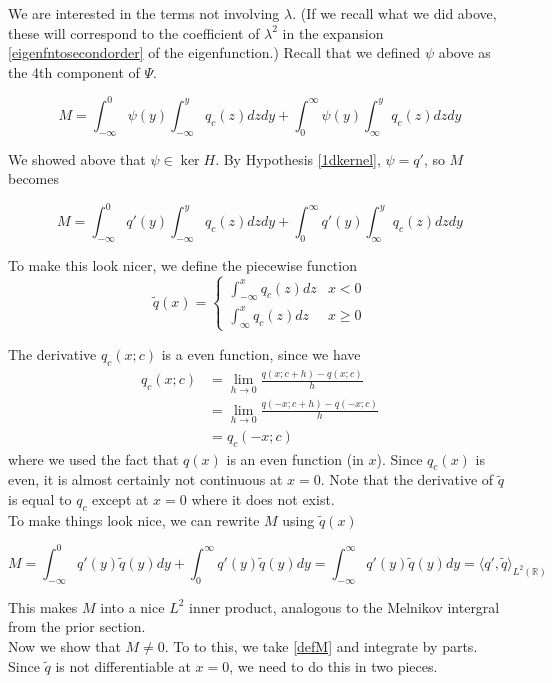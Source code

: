 \documentclass[12pt]{article}
\def\R{{\mathbb R}}
\begin{document}
We are interested in the terms not involving $\lambda$. (If we recall what we did above, these will correspond to the coefficient of $\lambda^2$ in the expansion \eqref{eigenfntosecondorder} of the eigenfunction.) Recall that we defined $\psi$ above as the 4th component of $\Psi$. 

\begin{equation}
M = \int_{-\infty}^0 \psi(y) \int_{-\infty}^y q_c(z) dz dy + \int_0^\infty \psi(y) \int_{\infty}^y q_c(z) dz dy 
\end{equation}

We showed above that $\psi \in \ker H$. By Hypothesis \ref{1dkernel}, $\psi = q'$, so $M$ becomes

\begin{equation}\label{defM}
M = \int_{-\infty}^0 q'(y) \int_{-\infty}^y q_c(z) dz dy + \int_0^\infty q'(y) \int_{\infty}^y q_c(z) dz dy
\end{equation}

To make this look nicer, we define the piecewise function
\[
\tilde{q}(x) = \begin{cases}
\int_{-\infty}^x q_c(z) dz & x < 0 \\
\int_{\infty}^x q_c(z) dz & x \geq 0
\end{cases}
\]

The derivative $q_c(x; c)$ is a even function, since we have
\begin{align*}
q_c(x; c) &= \lim_{h \rightarrow 0}\frac{q(x; c+h) - q(x; c)}{h} \\
&= \lim_{h \rightarrow 0}\frac{q(-x; c+h) - q(-x; c)}{h} \\
&= q_c(-x; c)
\end{align*}
where we used the fact that $q(x)$ is an even function (in $x$). Since $q_c(x)$ is even, it is almost certainly not continuous at $x = 0$. Note that the derivative of $\tilde{q}$ is equal to $q_c$ except at $x = 0$ where it does not exist.\\

To make things look nice, we can rewrite $M$ using $\tilde{q}(x)$

\[
M = \int_{-\infty}^0 q'(y) \tilde{q}(y) dy + \int_0^\infty q'(y) \tilde{q}(y) dy = \int_{-\infty}^\infty q'(y) \tilde{q}(y) dy = \langle q', \tilde{q} \rangle_{L^2(\R)}
\]

This makes $M$ into a nice $L^2$ inner product, analogous to the Melnikov intergral from the prior section.\\

Now we show that $M \neq 0$. To to this, we take \eqref{defM} and integrate by parts. Since $\tilde{q}$ is not differentiable at $x = 0$, we need to do this in two pieces.
\end{document}
